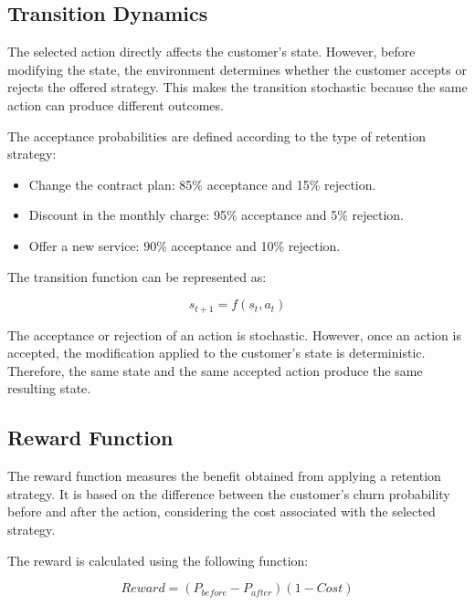 \documentclass{article}
\begin{document}
\subsection{Transition Dynamics}

The selected action directly affects the customer's state. However, before modifying the state,
the environment determines whether the customer accepts or rejects the offered strategy. This
makes the transition stochastic because the same action can produce different outcomes.

The acceptance probabilities are defined according to the type of retention strategy:

\begin{itemize}
\item Change the contract plan: 85\% acceptance and 15\% rejection.
\item Discount in the monthly charge: 95\% acceptance and 5\% rejection.
\item Offer a new service: 90\% acceptance and 10\% rejection.
\end{itemize}

The transition function can be represented as:

\begin{equation}
s_{t+1} = f(s_t, a_t)
\end{equation}

The acceptance or rejection of an action is stochastic. However, once an action is accepted,
the modification applied to the customer's state is deterministic. Therefore, the same state
and the same accepted action produce the same resulting state.

\subsection{Reward Function}

The reward function measures the benefit obtained from applying a retention strategy. It is based
on the difference between the customer's churn probability before and after the action, considering
the cost associated with the selected strategy.

The reward is calculated using the following function:

\begin{equation}
Reward = ( P_{before} - P_{after} ) (1 - Cost)
\end{equation}
\end{document}
